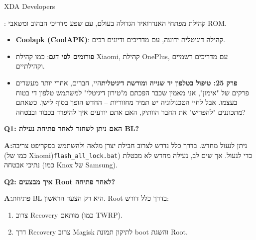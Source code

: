XDA Developers

\begin{tcbinfo}{: קהילת מפתחי האנדרואיד הגדולה בעולם, עם שפע מדריכי הבהוב ומשאבי ROM.}
\begin{itemize}
  \item \textbf{Coolapk (CoolAPK)}: קהילה דיגיטלית ידועה, עם מדריכים ודיונים רבים.
  \item \textbf{פורומים לפי דגם}: כמו קהילת Xiaomi, קהילת OnePlus, עם מדריכים רשמיים וקהילתיים.
  \item \textbf{פרק 25: טיפול בטלפון יד שנייה ומורשת דיגיטלית}היי, חברים, אחרי יותר מעשרים פרקים של "אימון", אני מאמין שכבר הפכתם מ"טירון דיגיטלי" למשתמש טלפון די בטוח בעצמו. אבל לחיי הטכנולוגיה יש תמיד מחזוריות – החדש הופך בסוף לישן. כשאתם מתכוננים "להפריש" את החבר הוותיק, האם אתם יודעים איך להיפרד בכבוד ובבטחה?
\end{itemize}

\end{tcbinfo}


\textbf{Q1: האם ניתן לשחזר לאחר פתיחת נעילת BL?}\par

\textbf{A:}ניתן לנעול מחדש. בדרך כלל נדרש לצרוב חבילת יצרן מלאה ולהשתמש בסקריפט צריבה (כמו של Xiaomi)\texttt{flash\_all\_lock.\allowbreak bat}) כדי לנעול. אך שים לב, נעילה מחדש לא מבטלת נתיכי אבטחה (כמו Knox של Samsung).

\textbf{Q2: איך מבצעים Root לאחר פתיחה?}\par

\textbf{A:}פתיחת BL היא רק הצעד הראשון. Root בדרך כלל דורש:

\begin{enumerate}
  \item צרוב Recovery מותאם (כמו TWRP).
  \item דרך Recovery צרוב Magisk לתיקון תמונת boot והשגת Root.
\end{enumerate}
